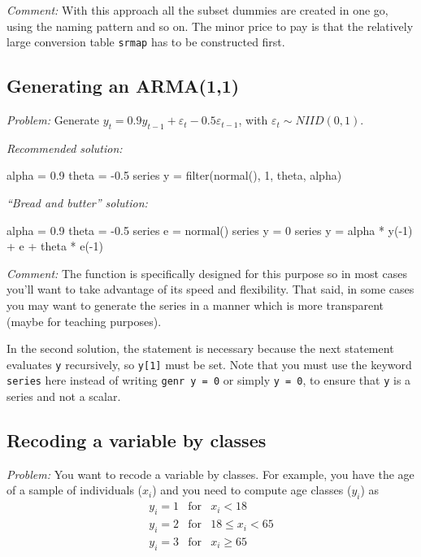 \emph{Comment:} With this approach all the subset dummies are created
in one go, using the naming pattern  and so on. The
minor price to pay is that the relatively large conversion table
\texttt{srmap} has to be constructed first.

\subsection{Generating an ARMA(1,1)}

\emph{Problem:} Generate $y_t = 0.9 y_{t-1} + \varepsilon_t - 0.5
\varepsilon_{t-1}$, with $\varepsilon_t \sim N\!I\!I\!D(0,1)$.

\emph{Recommended solution:}
\begin{code}
alpha = 0.9
theta = -0.5
series y = filter(normal(), {1, theta}, alpha)
\end{code}

\emph{``Bread and butter'' solution:}
\begin{code}
alpha = 0.9
theta = -0.5
series e = normal()
series y = 0
series y = alpha * y(-1) + e + theta * e(-1)
\end{code}

\emph{Comment:} The  function is specifically designed for
this purpose so in most cases you'll want to take advantage of its
speed and flexibility. That said, in some cases you may want to
generate the series in a manner which is more transparent (maybe for
teaching purposes).

In the second solution, the statement  is necessary
because the next statement evaluates \texttt{y} recursively, so
\texttt{y[1]} must be set.  Note that you must use the keyword
\texttt{series} here instead of writing \texttt{genr y = 0} or simply
\texttt{y = 0}, to ensure that \texttt{y} is a series and
not a scalar.

\subsection{Recoding a variable by classes}

\emph{Problem:} You want to recode a variable by classes. For example,
you have the age of a sample of individuals ($x_i$) and you need to
compute age classes ($y_i$) as
\begin{eqnarray*}
  y_i = 1 & \mathrm{for} & x_i < 18 \\
  y_i = 2 & \mathrm{for} & 18 \le x_i < 65 \\
  y_i = 3 & \mathrm{for} & x_i \ge 65
\end{eqnarray*}

